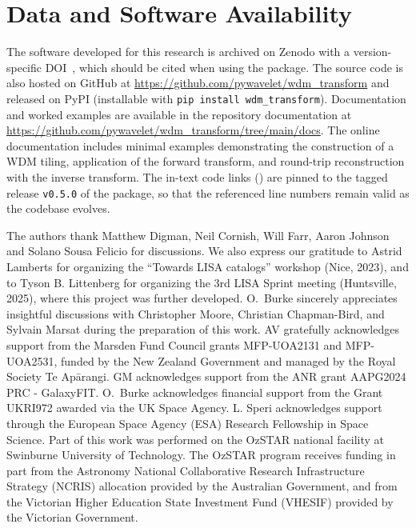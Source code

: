 \documentclass[twocolumn,preprintnumbers,
  superscriptaddress,
  nofootinbib,
  amsmath,
  amssymb,
  aps,
  prd,
  colorlinks=true,
  linkcolor=blue,
  urlcolor=blue,
  citecolor=blue,
  anchorcolor=blue
]{revtex4-2}
\begin{document}
\section*{Data and Software Availability}
The software developed for this research is archived on Zenodo with a
version-specific DOI~\cite{wdm_transform_zenodo}, which should be cited when
using the package.
The source code is also hosted on GitHub at
\url{https://github.com/pywavelet/wdm_transform} and released on PyPI
(installable with \texttt{pip install wdm\_transform}). Documentation and worked
examples are available in the repository documentation at
\url{https://github.com/pywavelet/wdm_transform/tree/main/docs}.
The online documentation includes minimal examples demonstrating the construction of a WDM tiling, application of the forward transform, and round-trip reconstruction with the inverse transform. The in-text code links (\scalebox{0.65}{\faGithub}) are pinned to the tagged release \texttt{v0.5.0} of the package, so that the referenced line numbers remain valid as the codebase evolves.

\begin{acknowledgments}
    The authors thank Matthew Digman, Neil Cornish, Will Farr, Aaron Johnson and Solano Sousa Felicio for discussions.
    We also express our gratitude to Astrid Lamberts for organizing the ``Towards LISA catalogs'' workshop (Nice, 2023), and to Tyson B. Littenberg for organizing the 3rd LISA Sprint meeting (Huntsville, 2025), where this project was further developed.
    O.~Burke sincerely appreciates insightful discussions with Christopher Moore, Christian Chapman-Bird, and Sylvain Marsat during the preparation of this work.
    AV gratefully acknowledges support from the Marsden Fund Council grants MFP-UOA2131 and MFP-UOA2531,
	funded by the New Zealand Government and managed by the Royal Society Te Apārangi.
    GM acknowledges support from the ANR grant AAPG2024 PRC - GalaxyFIT. 
    O.~Burke acknowledges financial support from the Grant UKRI972 awarded via the UK Space Agency.  
    L. Speri acknowledges support through the European Space Agency (ESA) Research Fellowship in Space Science.
    Part of this work was performed on the OzSTAR national facility at Swinburne
	University of Technology. The OzSTAR program receives funding in part from the Astronomy National Collaborative Research Infrastructure Strategy (NCRIS) allocation provided by the Australian Government, and from the Victorian Higher Education State Investment Fund (VHESIF) provided by the Victorian Government.
\end{acknowledgments}
\end{document}
